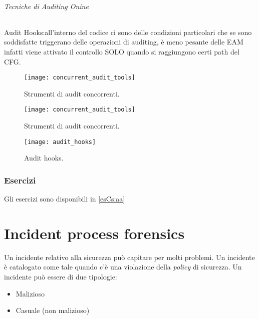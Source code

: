 \paragraph{Tecniche di Auditing Onine}
Audit Hooks:all'interno del codice ci sono delle condizioni particolari che se
sono soddisfatte triggerano delle operazioni di auditing, è meno pesante delle
EAM infatti viene attivato il controllo SOLO quando si raggiungono certi path
del CFG.
\begin{figure}[h!]
        \begin{center}
                \texttt{[image: concurrent\_audit\_tools]}
        \end{center}
        \caption{Strumenti di audit concorrenti.}
        \label{fig:concurrent:audit:tools}
\end{figure}

\begin{figure}[h!]
        \begin{center}
                \texttt{[image: concurrent\_audit\_tools]}
        \end{center}
        \caption{Strumenti di audit concorrenti.}
        \label{fig:concurrent:audit:tools}
\end{figure}


\begin{figure}[h!]
        \begin{center}
                \texttt{[image: audit\_hooks]}
        \end{center}
        \caption{Audit hooks.}
        \label{fig:audit:hooks}
\end{figure}

\section{Esercizi}

Gli esercizi sono disponibili in \ref{esCs:aa}

\part{Incident process forensics}

Un incidente relativo alla sicurezza può capitare per molti problemi. Un
incidente è catalogato come tale quando c'è una violazione della \textit{policy}
di sicurezza. Un incidente può essere di due tipologie:
\begin{itemize}
\item Malizioso
\item Casuale (non malizioso)
\end{itemize}

